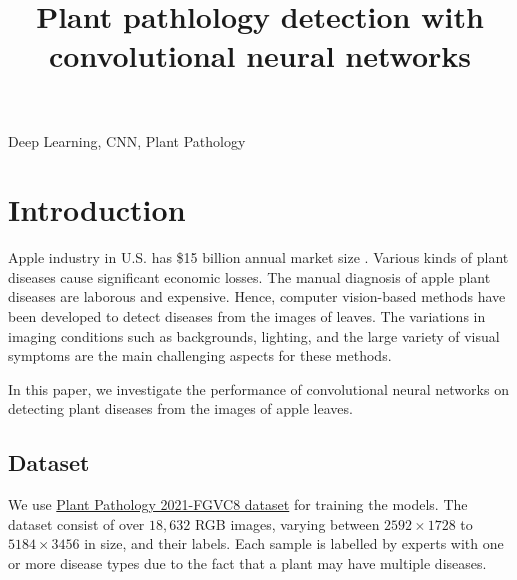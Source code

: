 \documentclass[conference]{IEEEtran}
\begin{document}

\title{Plant pathlology detection with convolutional neural networks\\ }

\author{
}


\maketitle

\begin{abstract}
\end{abstract}

\begin{IEEEkeywords}
Deep Learning, CNN, Plant Pathology
\end{IEEEkeywords}

\section{Introduction}

Apple industry in U.S. has \$15 billion annual market size \cite{Thapa2020}. 
Various kinds of plant diseases cause significant economic losses. 
The manual diagnosis of apple plant diseases are laborous and expensive. 
Hence, computer vision-based methods have been developed to detect diseases from the images of leaves. 
The variations in imaging conditions such as backgrounds, lighting, and the large variety of visual symptoms are the main challenging aspects for these methods. 

In this paper, we investigate the performance of convolutional neural networks on detecting 
plant diseases from the images of apple leaves.

\subsection{Dataset}
We use \href{https://www.kaggle.com/c/plant-pathology-2021-fgvc8/overview}{Plant Pathology 2021-FGVC8 dataset} for training the models. 
The dataset consist of over $18,632$ RGB images, 
varying between $2592 \times 1728$ to $5184 \times 3456$ in size, 
and their labels. Each sample is labelled by experts with one or more disease types 
due to the fact that a plant may have multiple diseases. 
\end{document}

